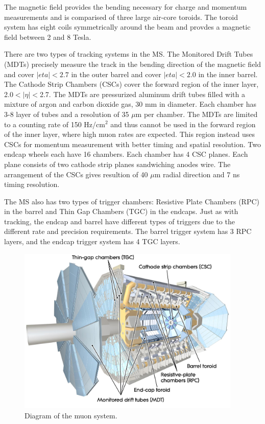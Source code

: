 The magnetic field provides the bending necessary for charge and momentum measurements and is comparised of three large air-core toroids. The toroid system has eight coils symmetrically around the beam and provdes a magnetic field between 2 and 8 Tesla. 

There are two types of tracking systems in the MS. The Monitored Drift Tubes (MDTs) precisely measure the track in the bending direction of the magnetic field and cover $|eta|<2.7$ in the outer barrel and cover $|eta|<2.0$ in the inner barrel. The Cathode Strip Chambers (CSCs) cover the forward region of the inner layer, 2.0$<|\eta|<$2.7. The MDTs are pressurized aluminum drift tubes filled with a mixture of argon and carbon dioxide gas, 30 mm in diameter. Each chamber has 3-8 layer of tubes and a resolution of 35 $\mu$m per chamber. The MDTs are limited to a counting rate of 150 Hz/cm$^2$ and thus cannot be used in the forward region of the inner layer, where high muon rates are expected. This region instead uses CSCs for momentum measurement with better timing and spatial resolution. Two endcap wheels each have 16 chambers. Each chamber has 4 CSC planes. Each plane consists of two cathode strip planes sandwiching anodes wire. The arrangement of the CSCs gives resultion of 40 $\mu$m radial direction and 7 ns timing resolution.

The MS also has two types of trigger chambers: Resistive Plate Chambers (RPC) in the barrel and Thin Gap Chambers (TGC) in the endcaps. Just as with tracking, the endcap and barrel have different types of triggers due to the different rate and precision requirements. The barrel trigger system has 3 RPC layers, and the endcap trigger system has 4 TGC layers. 

\begin{figure}[tp]
\includegraphics[width=0.95\textwidth]{fig/atlas/muonchamb.jpg}
\caption{Diagram of the muon system\cite{cern-jinst-atlas}.}
\label{fig:muonOverview}
\end{figure}


